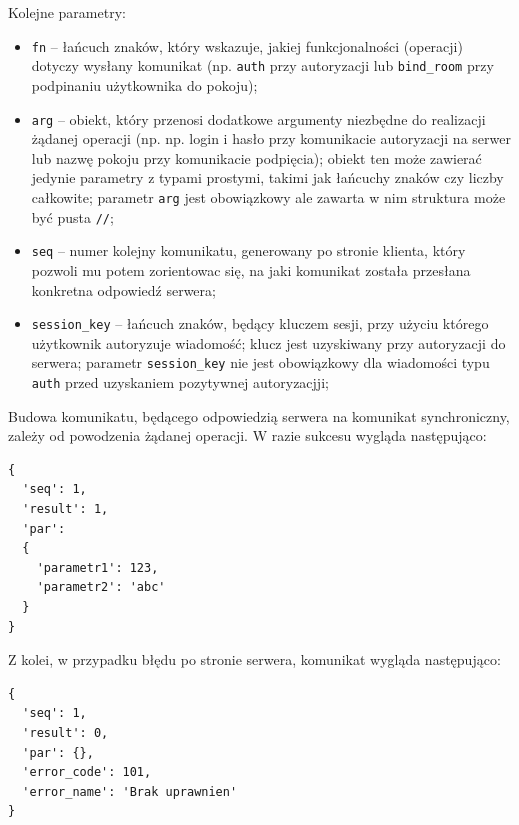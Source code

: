 Kolejne parametry:
\begin{itemize}
	\item \texttt{fn} -- łańcuch znaków, który wskazuje, jakiej funkcjonalności
	(operacji) dotyczy wysłany komunikat (np. \texttt{auth} przy autoryzacji
	lub \texttt{bind\_room} przy podpinaniu użytkownika do pokoju);

	\item \texttt{arg} -- obiekt, który przenosi dodatkowe argumenty niezbędne do
	realizacji żądanej operacji (np. np. login i hasło przy komunikacie autoryzacji na
	serwer lub nazwę pokoju przy komunikacie podpięcia); obiekt ten może zawierać jedynie
	parametry z typami prostymi, takimi jak łańcuchy znaków czy liczby całkowite;
	parametr \texttt{arg} jest obowiązkowy ale zawarta w nim struktura może być
	pusta \texttt{/{/}};

	\item \texttt{seq} -- numer kolejny komunikatu, generowany po stronie klienta,
	który pozwoli mu potem zorientowac się, na jaki komunikat została przesłana
	konkretna odpowiedź serwera;

	\item \texttt{session\_key} -- łańcuch znaków, będący kluczem sesji, przy użyciu
	którego użytkownik autoryzuje wiadomość; klucz jest uzyskiwany przy autoryzacji
	do serwera; parametr \texttt{session\_key} nie jest obowiązkowy dla wiadomości typu
	\texttt{auth} przed uzyskaniem pozytywnej autoryzacjji;
\end{itemize}

Budowa komunikatu, będącego odpowiedzią serwera na komunikat synchroniczny,
zależy od powodzenia żądanej operacji. W razie sukcesu wygląda następująco:

\begin{lstlisting}
{
  'seq': 1,
  'result': 1,
  'par':
  {
    'parametr1': 123,
    'parametr2': 'abc'
  }
}
\end{lstlisting}

Z kolei, w przypadku błędu po stronie serwera, komunikat wygląda następująco:

\begin{lstlisting}
{
  'seq': 1,
  'result': 0,
  'par': {},
  'error_code': 101,
  'error_name': 'Brak uprawnien'
}
\end{lstlisting}

